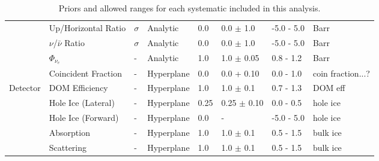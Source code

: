 \begin{landscape}
\begin{table}[]
\begin{tabular}{@{}llllllll@{}}
                               & Up/Horizontal Ratio               & $\sigma$                & Analytic   & 0.0                     & 0.0 $\pm$ 1.0   & -5.0 - 5.0    & Barr              \\
                               & $\nu$/$\bar{\nu}$ Ratio       & $\sigma$               & Analytic   & 0.0                     & 0.0 $\pm$ 1.0   & -5.0 - 5.0    & Barr              \\
                               & $\Phi_{\nu_e}$                    & -                             & Analytic   & 1.0                     & 1.0 $\pm$ 0.05 & 0.8 - 1.2     & Barr              \\
                               & Coincident Fraction                & -                            & Hyperplane & 0.0                     & 0.0 + 0.10        & 0.0 - 1.0     & coin fraction...? \\ \midrule
\multirow{5}{*}{Detector}      & DOM Efficiency        & -                             & Hyperplane & 1.0                     & 1.0 $\pm$ 0.1  & 0.7 - 1.3     & DOM eff           \\
                               & Hole Ice (Lateral)                   & -                            & Hyperplane & 0.25                    & 0.25 $\pm$ 0.10 & 0.0 - 0.5  & hole ice          \\
                               & Hole Ice (Forward)                 & -                            & Hyperplane & 0.0                     & -                        & -5.0 - 5.0    & hole ice          \\
                               & Absorption                            & -                            & Hyperplane & 1.0                     & 1.0 $\pm$ 0.1   & 0.5 - 1.5     & bulk ice          \\
                               & Scattering                             & -                            & Hyperplane & 1.0                     & 1.0 $\pm$ 0.1   & 0.5 - 1.5     & bulk ice          \\ \bottomrule
\end{tabular}
\caption{Priors and allowed ranges for each systematic included in this analysis.}
\label{tab:priors}
\end{table}
\end{landscape}
